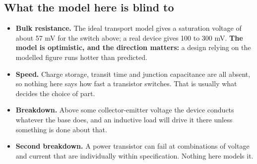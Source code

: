 \subsection{What the model here is blind to}
\label{c5:sec:a5}
\begin{itemize}
  \item \textbf{Bulk resistance.} The ideal transport model gives a saturation voltage of about 57 mV for the switch above; a real device gives 100 to 300 mV. \textbf{The model is optimistic, and the direction matters:} a design relying on the modelled figure runs hotter than predicted.
  \item \textbf{Speed.} Charge storage, transit time and junction capacitance are all absent, so nothing here says how fast a transistor switches. That is usually what decides the choice of part.
  \item \textbf{Breakdown.} Above some collector-emitter voltage the device conducts whatever the base does, and an inductive load will drive it there unless something is done about that.
  \item \textbf{Second breakdown.} A power transistor can fail at combinations of voltage and current that are individually within specification. Nothing here models it.
\end{itemize}
